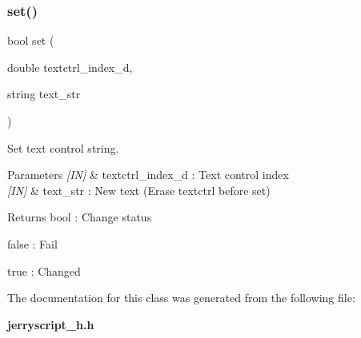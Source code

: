 \subsubsection{set()}
{\footnotesize\ttfamily bool set (\begin{DoxyParamCaption}\item[{double}]{textctrl\+\_\+index\+\_\+d,  }\item[{string}]{text\+\_\+str }\end{DoxyParamCaption})}



Set text control string. 


\begin{DoxyCode}{0}
\end{DoxyCode}



\begin{DoxyParams}{Parameters}
{\em \mbox{[}\+I\+N\mbox{]}} & textctrl\+\_\+index\+\_\+d \+: Text control index \\
\hline
{\em \mbox{[}\+I\+N\mbox{]}} & text\+\_\+str \+: New text (Erase textctrl before set) \\
\hline
\end{DoxyParams}
\begin{DoxyReturn}{Returns}
bool \+: Change status \begin{DoxyItemize}
\item false \+: Fail \item true \+: Changed \end{DoxyItemize}

\end{DoxyReturn}


The documentation for this class was generated from the following file\+:\begin{DoxyCompactItemize}
\item 
\textbf{ jerryscript\+\_\+h.\+h}\end{DoxyCompactItemize}
